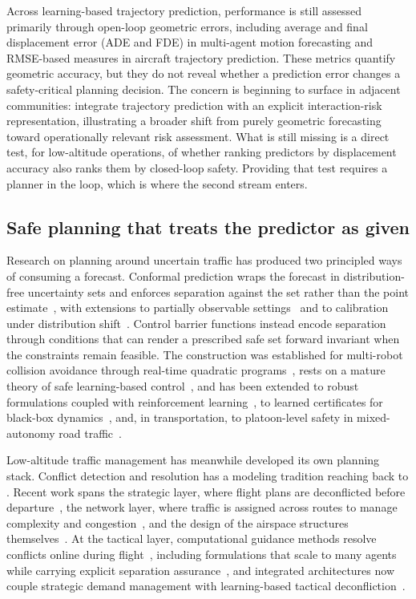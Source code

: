 \documentclass[11pt]{article}
\theoremstyle{plain}
\theoremstyle{definition}
\begin{document}
Across learning-based trajectory prediction, performance is still
assessed primarily through open-loop geometric errors, including
average and final displacement error (ADE and FDE) in multi-agent
motion forecasting and RMSE-based measures in aircraft trajectory
prediction. These metrics quantify geometric accuracy, but they do
not reveal whether a prediction error changes a safety-critical
planning decision. The concern is beginning to surface in adjacent
communities: \citet{liu2025risknet} integrate trajectory prediction
with an explicit interaction-risk representation, illustrating a
broader shift from purely geometric forecasting toward operationally
relevant risk assessment. What is still missing is a direct test, for
low-altitude operations, of whether ranking predictors by
displacement accuracy also ranks them by closed-loop safety.
Providing that test requires a planner in the loop, which is where
the second stream enters.

\subsection{Safe planning that treats the predictor as given}
\label{sec:related-planning}

Research on planning around uncertain traffic has produced two
principled ways of consuming a forecast. Conformal prediction wraps
the forecast in distribution-free uncertainty sets and enforces
separation against the set rather than the point
estimate~\citep{lindemann2023safe}, with extensions to partially
observable settings~\citep{sheng2024safe} and to calibration under
distribution shift~\citep{huang2025cuqds}. Control barrier functions
instead encode separation through conditions that can render a
prescribed safe set forward invariant when the constraints remain
feasible. The construction was established for multi-robot collision
avoidance through real-time quadratic
programs~\citep{wang2017safety}, rests on a mature theory of safe
learning-based control~\citep{brunke2022safe}, and has been extended
to robust formulations coupled with reinforcement
learning~\citep{emam2022sablas}, to learned certificates for
black-box dynamics~\citep{qin2022sablas}, and, in transportation, to
platoon-level safety in mixed-autonomy road
traffic~\citep{zhou2024platoon}.

Low-altitude traffic management has meanwhile developed its own
planning stack. Conflict detection and resolution has a modeling
tradition reaching back to \citet{kuchar2000review}. Recent work
spans the strategic layer, where flight plans are deconflicted before
departure~\citep{tang2023strategic}, the network layer, where traffic
is assigned across routes to manage complexity and
congestion~\citep{wang2023quasidynamic}, and the design of the
airspace structures themselves~\citep{bauranov2021designing}. At the
tactical layer, computational guidance methods resolve conflicts
online during flight~\citep{yang2021autonomous}, including
formulations that scale to many agents while carrying explicit
separation assurance~\citep{yang2020scalable}, and integrated
architectures now couple strategic demand management with
learning-based tactical deconfliction~\citep{chen2024integrated}.
\end{document}
